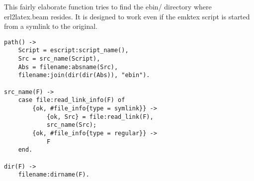 \documentclass[a4paper,12pt]{article}
\newenvironment{mylisting}
{\begin{list}{}{\setlength{\leftmargin}{1em}}\item\scriptsize\bfseries}
{\end{list}}
\begin{document}
This fairly elaborate function tries to find the ebin/ directory
where erl2latex.beam resides. It is designed to work even if the emktex
script is started from a symlink to the original.
\begin{mylisting}
\begin{verbatim}
path() ->
    Script = escript:script_name(),
    Src = src_name(Script),
    Abs = filename:absname(Src),
    filename:join(dir(dir(Abs)), "ebin").

src_name(F) ->
    case file:read_link_info(F) of
        {ok, #file_info{type = symlink}} ->
            {ok, Src} = file:read_link(F),
            src_name(Src);
        {ok, #file_info{type = regular}} ->
            F
    end.

dir(F) ->
    filename:dirname(F).
\end{verbatim}
\end{mylisting}
\end{document}
